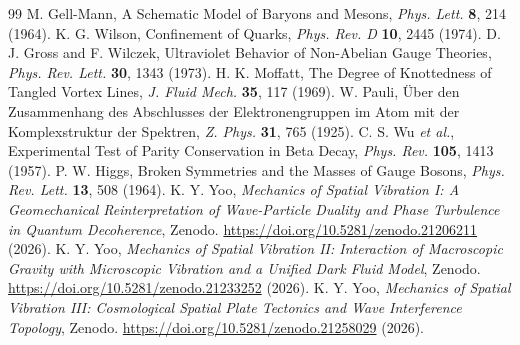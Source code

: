 \documentclass[reprint,amsmath,amssymb,aps,prd]{revtex4-2}
\begin{document}
\begin{thebibliography}{99}
 M. Gell-Mann, A Schematic Model of Baryons and Mesons, \textit{Phys. Lett.} \textbf{8}, 214 (1964).
 K. G. Wilson, Confinement of Quarks, \textit{Phys. Rev. D} \textbf{10}, 2445 (1974).
 D. J. Gross and F. Wilczek, Ultraviolet Behavior of Non-Abelian Gauge Theories, \textit{Phys. Rev. Lett.} \textbf{30}, 1343 (1973).
 H. K. Moffatt, The Degree of Knottedness of Tangled Vortex Lines, \textit{J. Fluid Mech.} \textbf{35}, 117 (1969).
 W. Pauli, \"{U}ber den Zusammenhang des Abschlusses der Elektronengruppen im Atom mit der Komplexstruktur der Spektren, \textit{Z. Phys.} \textbf{31}, 765 (1925).
 C. S. Wu \textit{et al.}, Experimental Test of Parity Conservation in Beta Decay, \textit{Phys. Rev.} \textbf{105}, 1413 (1957).
 P. W. Higgs, Broken Symmetries and the Masses of Gauge Bosons, \textit{Phys. Rev. Lett.} \textbf{13}, 508 (1964).
 K. Y. Yoo, \textit{Mechanics of Spatial Vibration I: A Geomechanical Reinterpretation of Wave-Particle Duality and Phase Turbulence in Quantum Decoherence}, Zenodo. \url{https://doi.org/10.5281/zenodo.21206211} (2026).
 K. Y. Yoo, \textit{Mechanics of Spatial Vibration II: Interaction of Macroscopic Gravity with Microscopic Vibration and a Unified Dark Fluid Model}, Zenodo. \url{https://doi.org/10.5281/zenodo.21233252} (2026).
 K. Y. Yoo, \textit{Mechanics of Spatial Vibration III: Cosmological Spatial Plate Tectonics and Wave Interference Topology}, Zenodo. \url{https://doi.org/10.5281/zenodo.21258029} (2026).
\end{thebibliography}
\end{document}
